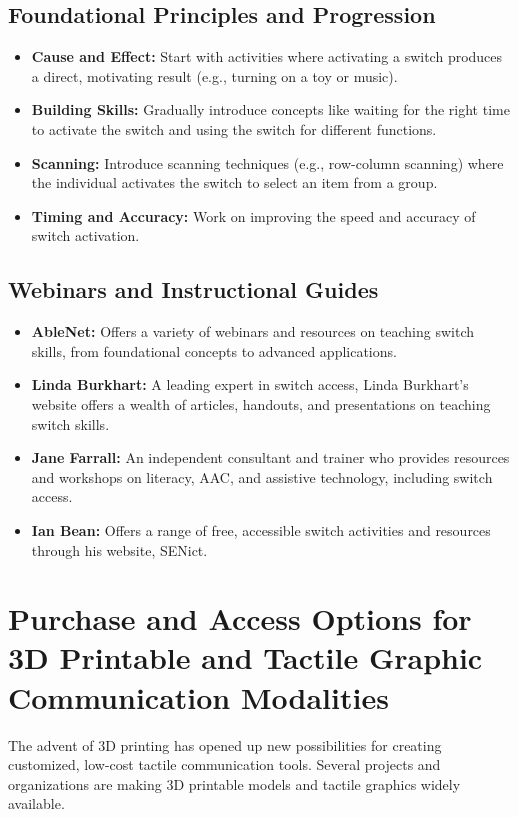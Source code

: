 \subsection{Foundational Principles and Progression}\label{app6:switch-principles}
\begin{itemize}
	\item \textbf{Cause and Effect:} Start with activities where activating a switch produces a direct, motivating result (e.g., turning on a toy or music).
	\item \textbf{Building Skills:} Gradually introduce concepts like waiting for the right time to activate the switch and using the switch for different functions.
	\item \textbf{Scanning:} Introduce scanning techniques (e.g., row-column scanning) where the individual activates the switch to select an item from a group.
	\item \textbf{Timing and Accuracy:} Work on improving the speed and accuracy of switch activation.
\end{itemize}

\subsection{Webinars and Instructional Guides}\label{app6:switch-guides}
\begin{itemize}
	\item \textbf{AbleNet:} Offers a variety of webinars and resources on teaching switch skills, from foundational concepts to advanced applications.
	\item \textbf{Linda Burkhart:} A leading expert in switch access, Linda Burkhart's website offers a wealth of articles, handouts, and presentations on teaching switch skills.
	\item \textbf{Jane Farrall:} An independent consultant and trainer who provides resources and workshops on literacy, AAC, and assistive technology, including switch access.
	\item \textbf{Ian Bean:} Offers a range of free, accessible switch activities and resources through his website, SENict.
\end{itemize}

\section{Purchase and Access Options for 3D Printable and Tactile Graphic Communication Modalities}\label{app6:3d-comm}
The advent of 3D printing has opened up new possibilities for creating customized, low-cost tactile communication tools. Several projects and organizations are making 3D printable models and tactile graphics widely available.

